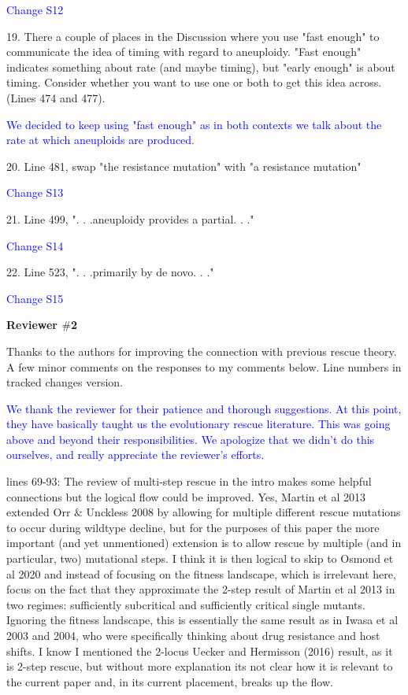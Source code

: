 \documentclass[12pt]{extarticle}
\begin{document}
\textcolor{blue}{Change S12}

19. There a couple of places in the Discussion where you use "fast enough" to communicate the idea of timing with regard to aneuploidy. "Fast enough" indicates something about rate (and maybe timing), but "early enough" is about timing. Consider whether you want to use one or both to get this idea across. (Lines 474 and 477).

\textcolor{blue}{We decided to keep using "fast enough" as in both contexts we talk about the rate at which aneuploids are produced.}

20. Line 481, swap "the resistance mutation" with "a resistance mutation"

\textcolor{blue}{Change S13}

21. Line 499, ". . .aneuploidy provides a partial. . ."

\textcolor{blue}{Change S14}

22. Line 523, ". . .primarily by de novo. . ."

\textcolor{blue}{Change S15}

\textbf{Reviewer $\#$2}

Thanks to the authors for improving the connection with previous rescue theory. A few minor comments on the responses to my comments below. Line numbers in tracked changes version.

\textcolor{blue}{We thank the reviewer for their patience and thorough suggestions. At this point, they have basically taught us the evolutionary rescue literature. 
This was going above and beyond their responsibilities. 
We apologize that we didn't do this ourselves, and really appreciate the reviewer's efforts.}

lines 69-93: The review of multi-step rescue in the intro makes some helpful connections but the logical flow could be improved. Yes, Martin et al 2013 extended Orr $\&$ Unckless 2008 by allowing for multiple different rescue mutations to occur during wildtype decline, but for the purposes of this paper the more important (and yet unmentioned) extension is to allow rescue by multiple (and in particular, two) mutational steps. I think it is then logical to skip to Osmond et al 2020 and instead of focusing on the fitness landscape, which is irrelevant here, focus on the fact that they approximate the 2-step result of Martin et al 2013 in two regimes: sufficiently subcritical and sufficiently critical single mutants. Ignoring the fitness landscape, this is essentially the same result as in Iwasa et al 2003 and 2004, who were specifically thinking about drug resistance and host shifts. I know I mentioned the 2-locus Uecker and Hermisson (2016) result, as it is 2-step rescue, but without more explanation its not clear how it is relevant to the current paper and, in its current placement, breaks up the flow.
\end{document}
